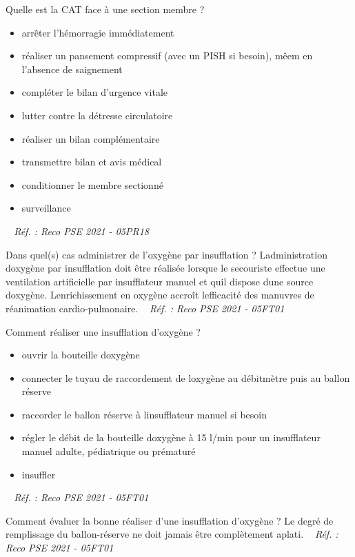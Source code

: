 \documentclass[grid,avery5371,landscape]{flashcards}
\makeatletter
\newcounter{nocarte}
\newcommand{\categ}[1]{%
  \def\@categ{#1}%
  \setcounter{nocarte}{0}%
}
\newcommand{\source}[1]{%
  \medskip
  \itshape%
   ~ \hfill Réf. : #1}
\makeatother
\begin{document}
\color[HTML]{003273}
\categ{PSE}
\begin{flashcard}[CAT]{
 Quelle est la CAT face à une section membre ?   }
  \begin{itemize}
\item arrêter l'hémorragie immédiatement 
\item réaliser un pansement compressif (avec un PISH si besoin), mêem en l'absence de saignement
\item compléter le bilan d'urgence vitale 
\item lutter contre la détresse circulatoire 
\item réaliser un bilan complémentaire
\item transmettre bilan et avis médical 
\item conditionner le membre sectionné
\item surveillance
\end{itemize}
  \source{Reco PSE 2021 - 05PR18}
\end{flashcard}


\color[HTML]{003273}
\categ{PSE}
\begin{flashcard}[CAT]{
 Dans quel(s) cas administrer de l'oxygène par insufflation ?   }
  Ladministration doxygène par insufflation doit être réalisée lorsque le secouriste effectue une ventilation artificielle par insufflateur manuel et quil dispose dune source doxygène. Lenrichissement en oxygène accroît lefficacité des manuvres de réanimation cardio-pulmonaire.
  \source{Reco PSE 2021 - 05FT01}
\end{flashcard}


\color[HTML]{003273}
\categ{PSE}
\begin{flashcard}[geste]{
 Comment réaliser une insufflation d'oxygène ?   }
  \begin{itemize}
 \item ouvrir la bouteille doxygène
\item connecter le tuyau de raccordement de loxygène au débitmètre puis au ballon réserve
\item raccorder le ballon réserve à linsufflateur manuel si besoin
\item régler le débit de la bouteille doxygène à 15 l/min pour un insufflateur manuel adulte, pédiatrique ou prématuré
\item insuffler \end{itemize}
  \source{Reco PSE 2021 - 05FT01}
\end{flashcard}


\color[HTML]{003273}
\categ{PSE}
\begin{flashcard}[geste]{
 Comment évaluer la bonne réaliser d'une insufflation d'oxygène ?   }
  Le degré de remplissage du ballon-réserve ne doit jamais être complètement aplati.
  \source{Reco PSE 2021 - 05FT01}
\end{flashcard}
\end{document}
